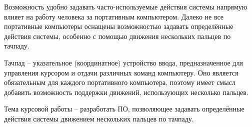 
Возможность удобно задавать часто-используемые действия системы напрямую влияет на работу человека за портативным компьютером. Далеко не все портативные компьютеры оснащены возможностью задавать определённые действия системы, особенно с помощью движения нескольких пальцев по тачпаду. 

Тачпад -- указательное (координатное) устройство ввода, предназначенное для управления курсором и отдачи различных команд компьютеру. Оно является обязательным для каждого портативного компьютера, поэтому имеет смысл добавить возможность поддержки движений, использующих несколько пальцев.

Тема курсовой работы -- разработать ПО, позволяющее задавать определённые действия системы движением нескольких пальцев по тачпаду.

\clearpage